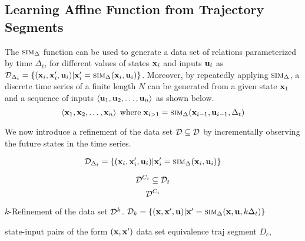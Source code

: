 


\subsection{Learning Affine Function from Trajectory Segments}

The $\mbox{\sc sim}_\Delta$ function can be used to generate a data set of
relations parameterized by time $\Delta_t$, for different values of
states $\mathbf{x}_i$ and inputs $\mathbf{u}_i$ as $\mathcal{D}_{\Delta_t} =
\{(\mathbf{x}_i,\mathbf{x}'_i,\mathbf{u}_i) | \mathbf{x}'_i = \mbox{\sc sim}_\Delta(\mathbf{x}_i,\mathbf{u}_i)\}$.
Moreover, by repeatedly applying $\mbox{\sc sim}_\Delta$, a discrete time series
of a finite length $N$ can be generated from a given state $\mathbf{x}_1$
and a sequence of inputs $\left\langle \mathbf{u}_1, \mathbf{u}_2,\ldots,\mathbf{u}_n \right \rangle$ as shown
below.
\[\left\langle \mathbf{x}_1, \mathbf{x}_2, \ldots, \mathbf{x}_n \right \rangle \;\text{where}\; \mathbf{x}_{i>1} =
\mbox{\sc sim}_\Delta(\mathbf{x}_{i-1}, \mathbf{u}_{i-1}, \Delta_t)\]

We now introduce a refinement of the data set $\mathcal{D} \subseteq \mathcal{D}$ by
incrementally observing the future states in the time series.



\[\mathcal{D}_{\Delta_t} = \{(\mathbf{x}_i,\mathbf{x}'_i,\mathbf{u}_i) | \mathbf{x}'_i =
\mbox{\sc sim}_\Delta(\mathbf{x}_i,\mathbf{u}_i)\}\]

\[\mathcal{D}^{C_i} \subseteq \mathcal{D}_t\]
\[\mathcal{D}^{C_i}\]


$k$-Refinement of the data set $\mathcal{D}^k$.
$\mathcal{D}_k = \{(\mathbf{x},\mathbf{x}',\mathbf{u}) | \mathbf{x}' =  \mbox{\sc sim}_\Delta(\mathbf{x},\mathbf{u},k\Delta_t)\}$

state-input pairs of the form
$(\mathbf{x},\mathbf{x}')$
data set equivalence traj segment
$D_c, $
